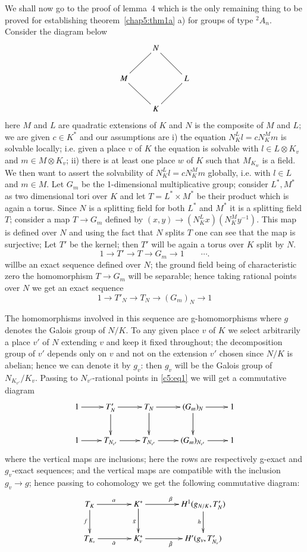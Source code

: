 We shall now go to the proof of lemma~4 which is the only remaining
thing to be proved for establishing theorem~\ref{chap5:thm1a} a) for
groups of type 
${}^2A_n$. Consider the diagram below  
\[
\xymatrix{
& N \ar@{-}[dr] \ar@{-}[dl] & \\
M \ar@{-}[dr]& & L \ar@{-}[dl]\\
& K & 
}
\]
here $M$ and $L$ are quadratic extensions of $K$ and $N$ is the
composite of $M$ and $L$; we are given $c \in K^*$ and our
assumptions are \; i) the equation $N^L_K l = c N^M_K m$ is solvable
locally; i.e. given a place $v$ of $K$ the equation is solvable with
$l \in L \otimes K_v$ and $m \in M \otimes K_v$; \; ii) there is at
least one place $w$ of $K$ such that $M_{K_w}$ is a field. We then
want to assert the solvability of $N^L_K l =  c N^M_K m$ globally,
i.e. with $l \in L$ and $m \in M$. Let $G_m$ be the 1-dimensional
multiplicative group; consider $L^*, M^*$ as two dimensional tori over
$K$ and let $T = L^* \times M^*$ be their product which is again a
torus. Since $N$ is a splitting field for both $L^*$ and $M^*$ it is a
splitting field $T$; consider a map $T \to G_m$ defined by $(x, y) \to
(N^L_K x) (N^M_K y^{-1})$. This map is defined over $N$ and using the
fact that $N$ splits $T$ one can see that the map is surjective; Let
$T'$ be the kernel; then $T'$ will be again a torus over $K$ split by
$N$. 
\begin{equation*}
1 \to T' \to T \to G_m \to 1 \qquad \cdots . \tag{1}\label{c5:eq1}
\end{equation*}
will\pageoriginale be an exact sequence defined over $N$; the ground
field being of characteristic zero the homomorphism $T \to G_m$ will
be separable; hence taking rational points over $N$ we get an exact
sequence   
$$
1 \to T'_N \to T_N \to (G_m)_N \to 1
$$

The homomorphisms involved in this sequence are g-homomorphi\-sms where
$g$ denotes the Galois group of $N/K$. To any given place  $v$ of $K$
we select arbitrarily a place $v'$ of $N$ extending $v$ and keep it
fixed throughout; the decomposition group of $v'$ depends only on $v$
and not on the extension $v'$ chosen since $N/K$ is abelian; hence we
can denote it by $g_v$: then $g_v$ will be the Galois group of
$N_{K_{v'}} / K_v$. Passing to $N_{v'}$-rational points in \eqref{c5:eq1} we
will get a commutative diagram  
\[
\xymatrix{
1 \ar[r] & T'_N \ar[r]\ar[d] & T_N \ar[r] \ar[d] & (G_m)_N \ar[r]
\ar[d] & 1 \\
1 \ar[r] & T_{N_{v'}} \ar[r] & T_{N_{v'}} \ar[r] & (G_m)_{N_{v'}}
\ar[r] & 1
}
\]
where the vertical maps are inclusions; here the rows are respectively
g-exact and $g_v$-exact sequences; and the vertical maps are
compatible with the inclusion $g_v \to g$; hence passing to cohomology
we get the following commutative diagram: 
\[
\xymatrix@C=1.4cm{
T_K \ar[r]^{\alpha} \ar[d]_f & K^{\ast}  \ar[r]^{\beta} \ar[d]_g & H^1
(g_{N/K}, T'_N) \ar[d]_h \\
T_{K_v} \ar[r]_{\bar{\alpha}} & K^\ast_v \ar[r]_{\bar{\beta}} &
H'(g_v, T'_{N_v})
}
\]

